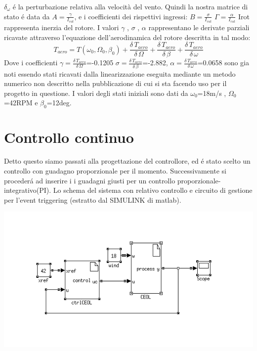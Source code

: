 \documentclass[a4paper,13pt]{article}
\begin{document}
$\delta_\omega$ \'e la perturbazione relativa alla velocità del vento.
Quindi la nostra matrice di stato \'e data da $A=\frac{\gamma}{I_{rot}}$,
e i coefficienti dei rispettivi ingressi:
$B=\frac{\sigma}{I_{rot}}$
$\Gamma=\frac{\alpha}{I_{rot}}$
Irot rappresenta inerzia del rotore.
I valori $\gamma$ , $\sigma$ , $\alpha$ rappresentano le derivate parziali ricavate attraverso 
l'equazione dell'aerodinamica del rotore descritta in tal modo:
\begin{equation}
T_{aero}=T(\omega_0,\Omega_0,\beta_0)+\frac{\delta \, T_{aero}}{\delta \, \Omega}+
\frac{\delta \, T_{aero}}{\delta \, \beta}+\frac{\delta \, T_{aero}}{\delta \, \omega}
\end{equation} 
Dove i coefficienti $\gamma=\frac{\delta \, T_{aero}}{\delta \, \Omega}$=-0.1205
$\sigma=\frac{\delta \, T_{aero}}{\delta \, \beta}$=-2.882,
$\alpha=\frac{\delta \, T_{aero}}{\delta \, \omega}$=0.0658
sono gia noti essendo stati ricavati dalla linearizzazione eseguita mediante un metodo numerico non descritto nella pubblicazione di cui si sta facendo uso per il progetto in questione.
I valori degli stati iniziali sono dati da $\omega_0$=18m/s , $\Omega_0$=42RPM e $\beta_0$=12deg.
\section{Controllo continuo}
Detto questo siamo passati alla progettazione del controllore, ed \'e stato scelto un controllo con guadagno proporzionale per il momento.
Successivamente si proceder\'a ad inserire i i guadagni giusti per un controllo proporzionale-integrativo(PI).
Lo schema del sistema con relativo controllo e circuito di gestione per l'event triggering (estratto dal SIMULINK di matlab).
\begin{center}
\includegraphics[scale=0.6]{eolcont.png}
\end{center}
\end{document}
